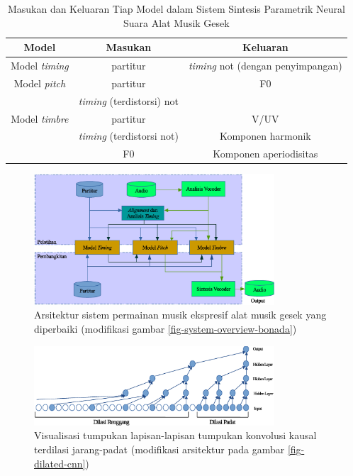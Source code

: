 \begin{table}[h]
    \centering
    \caption{Masukan dan Keluaran Tiap Model dalam Sistem Sintesis Parametrik Neural Suara Alat Musik Gesek }\label{tab-models-in-out-improvement}
    \begin{tabular}{ |c|c|c| } 
     \hline
     Model & Masukan & Keluaran \\
     \hline 
     Model \textit{timing} & partitur & \textit{timing} not (dengan penyimpangan) \\ 
     \hline
     Model \textit{pitch} & partitur & F0 \\ 
      & \textit{timing} (terdistorsi) not  & \\ 
     \hline
     Model \textit{timbre} & partitur & V/UV \\ 
      & \textit{timing} (terdistorsi not)  & Komponen harmonik\\ 
      & F0  & Komponen aperiodisitas\\ 
     \hline
    \end{tabular}
\end{table}

\begin{figure}[h]
    \centering
    \includegraphics[width=0.8\textwidth]{resources/system-overview.eps}
    \caption{Arsitektur sistem permainan musik ekspresif alat musik gesek yang diperbaiki (modifikasi gambar \ref{fig-system-overview-bonada})}\label{fig-system-overview-improvement}
\end{figure}

\begin{figure}[h]
    \centering
    \includegraphics[width=0.8\textwidth]{resources/sparse-dense-dilated-cnn.eps}
    \caption{Visualisasi tumpukan lapisan-lapisan tumpukan konvolusi kausal terdilasi jarang-padat (modifikasi arsitektur pada gambar \ref{fig-dilated-cnn})}\label{fig-sparsedilated-cnn}
\end{figure}

